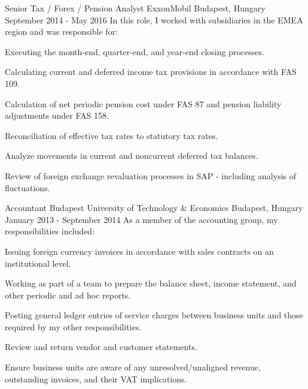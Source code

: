 \begin{cventries}

  \cventry
    {Senior Tax / Forex / Pension Analyst} %
    {ExxonMobil} %
    {Budapest, Hungary} %
    {September 2014 - May 2016} %
    {In this role, I worked with subsidiaries in the EMEA region and was responsible for:} %
    {
      \begin{cvitems} %
        \item {Executing the month-end, quarter-end, and year-end closing processes.}
        \item {Calculating current and deferred income tax provisions in accordance with FAS 109.}
        \item {Calculation of net periodic pension cost under FAS 87 and pension liability adjustments under FAS 158.}
        \item {Reconciliation of effective tax rates to statutory tax rates.}
        \item {Analyze movements in current and noncurrent deferred tax balances.}
        \item {Review of foreign exchange revaluation processes in SAP - including analysis of fluctuations.}
      \end{cvitems}
    }


  \cventry
    {Accountant} %
    {Budapest University of Technology \& Economics} %
    {Budapest, Hungary} %
    {January 2013 - September 2014} %
    {As a member of the accounting group, my responsibilities included:} %
    {
      \begin{cvitems} %
        \item {Issuing foreign currency invoices in accordance with sales contracts on an institutional level.}
        \item {Working as part of a team to prepare the balance sheet, income statement, and other periodic and ad hoc reports.}
        \item {Posting general ledger entries of service charges between business units and those required by my other responsibilities.}
        \item {Review and return vendor and customer statements.}
        \item {Ensure business units are aware of any unresolved/unaligned revenue, outstanding invoices, and their VAT implications.}
      \end{cvitems}
    }


\end{cventries}
